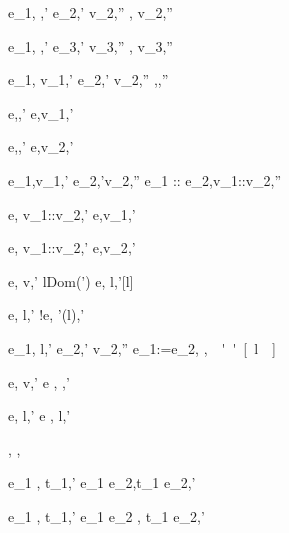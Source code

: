   { {e_1,{\sigma}{\eval} \True,{\sigma}'}\Quad
   {e_2,{\sigma}'{\eval} {v_2},{\sigma}''}}
  {,{\sigma}{\eval} {v_2},{\sigma}''}

  { {e_1,{\sigma}{\eval} \False ,{\sigma}'}\Quad
   {e_3,{\sigma}'{\eval} {v_3},{\sigma}''}}
  {,{\sigma}{\eval} {v_3},{\sigma}''}


  {e_1,{\sigma}{\eval} {v_1},{\sigma}' \Quad
   e_2,{\sigma}'{\eval} {v_2},{\sigma}''}
  {,{\sigma}{\eval},{\sigma}''}

  {e,\sigma\eval {},\sigma'}
  {\Fst e,\sigma\eval v_1,\sigma'}

  {e,\sigma\eval{},\sigma'}
  {\Snd e,\sigma \eval v_2,\sigma' }


  {e_1,{\sigma}{\eval}{v_1},{\sigma}'\Quad
   e_2,{\sigma}'{\eval}{v_2},{\sigma}''}
  {e_1 :: e_2,{\sigma}{\eval}{v_1}::{v_2},{\sigma}''}

  {e,{\sigma}{\eval} {v_1}::{v_2},{\sigma}'}
  {\Head e,{\sigma}{\eval}{v_1},{\sigma}'}

{e,{\sigma}{\eval} {v_1}::{v_2},{\sigma}'}
{\Tail e,{\sigma}{\eval}{v_2},{\sigma}'}



  {e,{\sigma}{\eval} {v},{\sigma}' \Quad
   l\not\in Dom({\sigma}')}
  {\Ref e,{\sigma}{\eval} l,{\sigma}'[l]}

  {e,{\sigma}{\eval} l,{\sigma}'}
  {!e,{\sigma}{\eval} {\sigma}'(l),{\sigma}'}

  {e_1,{\sigma}{\eval} l,{\sigma}' \Quad
   e_2,{\sigma}'{\eval} {v_2},{\sigma}''}
  {e_1:=e_2,{\sigma}{\eval} \unit,{\sigma}''[l]}

  {e,{\sigma} {\eval} {v},{\sigma}'}
  {\Edit e , {\sigma}{\eval} ,{\sigma}'}

  {e,{\sigma}{\eval} l,{\sigma}'}
  {\Update e ,{\sigma}{\eval} \Update l,{\sigma}'}


  {}
  {\Fail,{\sigma} {\eval} \Fail,{\sigma}}


  {e_1 ,{\sigma}{\eval} {t_1},{\sigma}'}
  {e_1 \Then e_2,{\sigma}{\eval}{t_1} \Then e_2,{\sigma}'}

  {e_1 ,{\sigma}{\eval} {t_1},{\sigma}'}
  {e_1 \Next e_2 ,{\sigma}{\eval} {t_1} \Next e_2,{\sigma}'}


